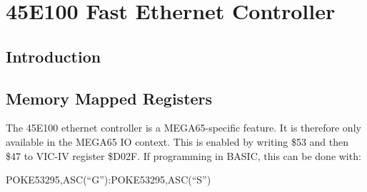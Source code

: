\chapter{45E100 Fast Ethernet Controller}

\section{Introduction}

\section{Memory Mapped Registers}

The 45E100 ethernet controller is a MEGA65-specific feature.
It is therefore only available in the MEGA65 IO context.
This is enabled by writing \$53 and then \$47 to VIC-IV register \$D02F.
If programming in BASIC, this can be done with:

\begin{screenoutput}
POKE53295,ASC(``G''):POKE53295,ASC(``S'')
\end{screenoutput}



